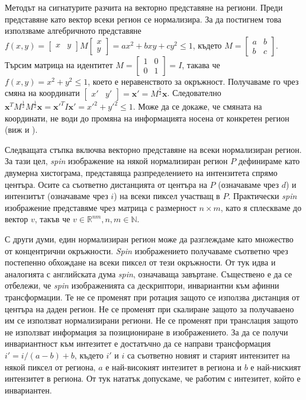 \documentclass[a4paper,12pt]{article}
\begin{document}
Методът на сигнатурите разчита на векторно представяне на региони. Преди представяне като вектор всеки регион се нормализира. За да постигнем това използваме алгебричното представяне $f(x,y) = \begin{bmatrix} x & y \end{bmatrix} M \begin{bmatrix} x\\ y \end{bmatrix} = ax^2 + bxy + cy^2 \leq 1$, където $M=\begin{bmatrix} a & b\\ b & c \end{bmatrix}$. Търсим матрица на идентитет $M = \begin{bmatrix} 1 & 0\\ 0 & 1 \end{bmatrix} = I$, такава че $f(x, y) = x^2 + y^2 \leq 1$, което е неравенството за окръжност. Получаваме го чрез смяна на координати $\begin{bmatrix} x' & y' \end{bmatrix} = \mathbf{x'} = M^{\frac{1}{2}} \mathbf{x}$. Следователно $\mathbf{x}^T M^{\frac{1}{2}} M^{\frac{1}{2}} \mathbf{x} = \mathbf{x'}^T I \mathbf{x'} = x'^2 + y'^2 \leq 1$. Може да се докаже, че смяната на координати, не води до промяна на информацията носена от конкретен регион (виж \cite{shapeadaptedsmoothingfor3dcues} и \cite{affineinvariantipdetector}).

\bigbreak

Следващата стъпка включва векторно представяне на всеки нормализиран регион. За тази цел, \textit{spin} изображение на някой нормализиран регион $P$ дефинираме като двумерна хистограма, представяща разпределението на интензитета спрямо центъра. Осите са съответно дистанцията от центъра на $P$ (означаваме чрез $d$) и интензитът (означаваме чрез $i$) на всеки пиксел участващ в $P$. Практически \textit{spin} изображение представяме чрез матрица с размерност $n \times m$, като я сплескваме до вектор $v$, такъв че $v \in \mathbb{R}^{nm}, n,m \in \mathbb{N}$.

\bigbreak

С други думи, един нормализиран регион може да разглеждаме като множество от концентрични окръжности. \textit{Spin} изображението получаваме съответно чрез постепенно обхождане на всеки пиксел от тези окръжности. От тук идва и аналогията с английската дума \textit{spin}, означаваща завъртане. Съществено е да се отбележи, че \textit{spin} изображенията са дескриптори, инвариантни към афинни трансформации. Те не се променят при ротация защото се използва дистанция от центъра на даден регион. Не се променят при скалиране защото за получаваено им се използват нормализирани региони. Не се променят при транслация защото не използват информация за позициониране в изображението. За да се получи инвариантност към интезитет е достатъчно да се направи трансформация $i' = i / (a-b) + b$, където $i'$ и $i$ са съответно новият и старият интензитет на някой пиксел от региона, $a$ е най-високият интезитет в региона и $b$ е най-ниският интензитет в региона. От тук нататък допускаме, че работим с интезитет, който е инвариантен.
\end{document}
